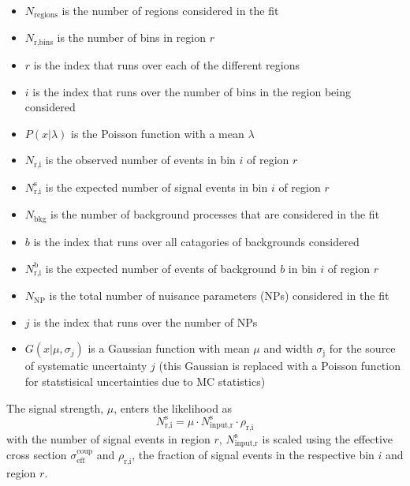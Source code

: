 \begin{itemize}
\item $N_{\text{regions}}$ is the number of regions considered in the fit
\item $N_\text{r,bins}$ is the number of bins in region $r$
\item $r$ is the index that runs over each of the different regions
\item $i$ is the index that runs over the number of bins in the region being considered
\item $P(x|\lambda)$ is the Poisson function with a mean $\lambda$
\item $N_\text{r,i}$ is the observed number of events in bin $i$ of region $r$
\item $N_\text{r,i}^\text{s}$ is the expected number of signal events in bin $i$ of region $r$
\item $N_\text{bkg}$ is the number of background processes that are considered in the fit
\item $b$ is the index that runs over all catagories of backgrounds considered
\item $N_\text{r,i}^\text{b}$ is the expected number of events of background $b$ in bin $i$ of region $r$
\item $N_\text{NP}$ is the total number of nuisance parameters (NPs) considered in the fit
\item $j$ is the index that runs over the number of NPs
\item $G(x|\mu,\sigma_{j})$ is a Gaussian function with mean $\mu$ and width $\sigma_\text{j}$ for the source of systematic uncertainty $j$ (this Gaussian is replaced with a Poisson function for statstisical uncertainties due to MC statistics)
\end{itemize}

The signal strength, $\mu$, enters the likelihood as
\[ N_\text{r,i}^\text{s} = \mu \cdot N_\text{input,r}^\text{s} \cdot \rho_\text{r,i}
\]
with the number of signal events in region $r$, $N_\text{input,r}^\text{s}$ is scaled using the effective cross section $\sigma_\text{eff}^\text{coup}$ and $\rho_\text{r,i}$, the fraction of signal events in the respective bin $i$ and region $r$. 

